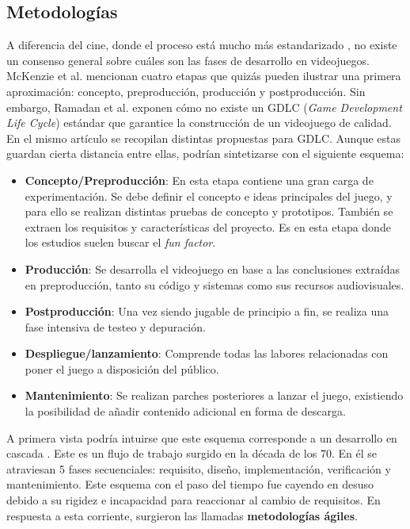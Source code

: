 \subsection{Metodologías}

A diferencia del cine, donde el proceso está mucho más estandarizado \cite{ENGSTROM201810}, no existe un consenso general sobre cuáles son las fases de desarrollo en videojuegos. McKenzie et al. \cite{mckenzie} mencionan cuatro etapas que quizás pueden ilustrar una primera aproximación: concepto, preproducción, producción y postproducción. Sin embargo, Ramadan et al. \cite{ramadan} exponen cómo no existe un GDLC (\textit{Game Development Life Cycle}) estándar que garantice la construcción de un videojuego de calidad. En el mismo artículo se recopilan distintas propuestas para GDLC. Aunque estas guardan cierta distancia entre ellas, podrían sintetizarse con el siguiente esquema:

\begin{itemize}
    \item \textbf{Concepto/Preproducción}: En esta etapa contiene una gran carga de experimentación. Se debe definir el concepto e ideas principales del juego, y para ello se realizan distintas pruebas de concepto y prototipos. También se extraen los requisitos y características del proyecto. Es en esta etapa donde los estudios suelen buscar el \textit{fun factor}.
    \item \textbf{Producción}: Se desarrolla el videojuego en base a las conclusiones extraídas en preproducción, tanto su código y sistemas como sus recursos audiovisuales.
    \item \textbf{Postproducción}: Una vez siendo jugable de principio a fin, se realiza una fase intensiva de testeo y depuración.
    \item \textbf{Despliegue/lanzamiento}: Comprende todas las labores relacionadas con poner el juego a disposición del público.
    \item \textbf{Mantenimiento}: Se realizan parches posteriores a lanzar el juego, existiendo la posibilidad de añadir contenido adicional en forma de descarga.
\end{itemize}

A primera vista podría intuirse que este esquema corresponde a un desarrollo en cascada \cite{waterfall}. Este es un flujo de trabajo surgido en la década de los 70. En él se atraviesan 5 fases secuenciales: requisito, diseño, implementación, verificación y mantenimiento. Este esquema con el paso del tiempo fue cayendo en desuso debido a su rigidez e incapacidad para reaccionar al cambio de requisitos. En respuesta a esta corriente, surgieron las llamadas \textbf{metodologías ágiles}.

